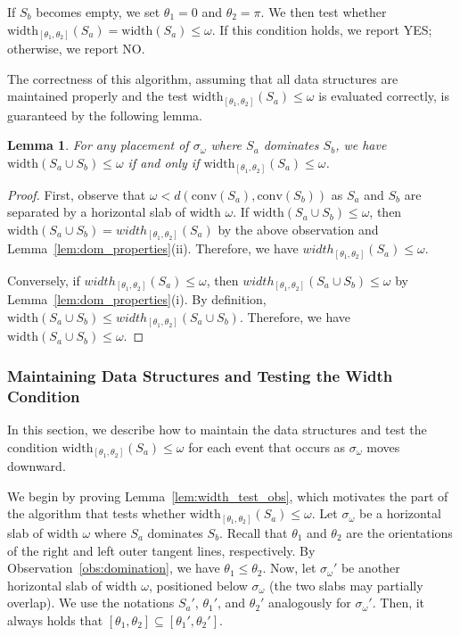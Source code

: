 \documentclass[10pt,a4paper]{article}
\newtheorem{lemma}[theorem]{Lemma}
\theoremstyle{star}
\theoremstyle{claimstar}
\newcommand{\width}{\ensuremath{\mathrm{width}}}
\newcommand{\conv}{\ensuremath{\mathrm{conv}}}
\begin{document}
If $S_b$ becomes empty, we set $\theta_1 = 0$ and $\theta_2 = \pi$. 
We then test whether $\width_{[\theta_1, \theta_2]}(S_a) = \width(S_a) \le \omega$. 
If this condition holds, we report YES; otherwise, we report NO.


The correctness of this algorithm, assuming that all data structures are maintained properly and the test $\width_{[\theta_1, \theta_2]}(S_a) \le \omega$ is evaluated correctly, is guaranteed by the following lemma.


\begin{lemma}
    \label{lem:decision_correctness}
    For any placement of $\sigma_\omega$ where $S_a$ dominates $S_b$, we have $\width(S_a \cup S_b) \le \omega$ if and only if $\width_{[\theta_1, \theta_2]}(S_a) \le \omega$. 
\end{lemma}

\begin{proof}
    First, observe that $\omega < d(\conv(S_a), \conv(S_b)) $ 
    as $S_a$ and $S_b$ are separated by a horizontal slab of width $\omega$.
    If $\width(S_a \cup S_b) \le \omega$, then $\width(S_a\cup S_b) =width_{[\theta_1, \theta_2]}(S_a)$ by the above observation and Lemma~\ref{lem:dom_properties}(ii).
    Therefore, we have $width_{[\theta_1, \theta_2]}(S_a) \le \omega$. 

    Conversely, if $width_{[\theta_1, \theta_2]}(S_a) \le \omega$, then $width_{[\theta_1, \theta_2]}(S_a \cup S_b) \le \omega$ by Lemma~\ref{lem:dom_properties}(i).
    By definition, $\width(S_a \cup S_b) \le width_{[\theta_1, \theta_2]}(S_a \cup S_b)$.
    Therefore, we have $\width(S_a \cup S_b) \le \omega$.
\end{proof}




\subsubsection{Maintaining Data Structures and Testing the Width Condition}
\label{sec:ds_maintain}


In this section, we describe how to maintain the data structures and test the condition $\width_{[\theta_1, \theta_2]}(S_a) \le \omega$ for each event that occurs as $\sigma_\omega$ moves downward.

We begin by proving Lemma~\ref{lem:width_test_obs}, which motivates the part of the algorithm that tests whether $\width_{[\theta_1, \theta_2]}(S_a) \le \omega$.
Let $\sigma_\omega$ be a horizontal slab of width $\omega$ where $S_a$ dominates $S_b$.
Recall that $\theta_1$ and $\theta_2$ are the orientations of the right and left outer tangent lines, respectively.
By Observation~\ref{obs:domination}, we have $\theta_1 \le \theta_2$.
Now, let $\sigma_\omega'$ be another horizontal slab of width $\omega$, positioned below $\sigma_\omega$ (the two slabs may partially overlap).
We use the notations $S_a'$, $\theta_1'$, and $\theta_2'$ analogously for $\sigma_{\omega}'$.
Then, it always holds that $[\theta_1, \theta_2] \subseteq[\theta_1', \theta_2']$.
\end{document}
